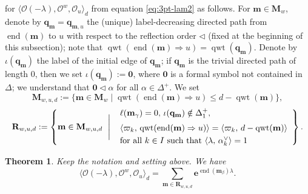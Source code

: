 \documentclass[11pt,a4paper,reqno,dvipdfmx]{amsart}
\numberwithin{equation}{section}
\newcommand{\CO}{\mathcal{O}}
\newcommand{\vpi}{\varpi}
\newcommand{\be}{\mathbf{e}}
\newcommand{\bm}{\mathbf{m}}
\newcommand{\bq}{\mathbf{q}}
\newcommand{\bM}{\mathbf{M}}
\newcommand{\bzero}{\mathbf{0}}
\DeclareMathOperator{\qwt}{qwt}
\DeclareMathOperator{\ed}{end}
\newcommand{\pair}[2]{\langle #1,\,#2 \rangle}
\newcommand{\bfR}{\mathbf{R}}
\theoremstyle{plain}
\newtheorem{thm}[lem]{Theorem}
\theoremstyle{definition}
\theoremstyle{remark}
\begin{document}
for $\langle \CO(- \lambda),\CO^{w},\CO_{u} \rangle_{d}$ from equation \eqref{eq:3pt-lam2} as follows. 
For $\bm \in \bM_{w}$, denote by $\bq_{\bm}=\bq_{\bm,u}$ 
the (unique) label-decreasing directed path from $\ed(\bm)$ to $u$ with respect to 
the reflection order $\lhd$ (fixed at the beginning of this subsection); 
note that $\qwt(\ed(\bm) \Rightarrow u) = \qwt(\bq_{\bm})$. 
Denote by $\iota(\bq_{\bm})$ the label of the initial edge of $\bq_{\bm}$; 
if $\bq_{\bm}$ is the trivial directed path of length $0$, 
then we set $\iota(\bq_{\bm}) := \bzero$, where $\bzero$ is a formal symbol 
not contained in $\Delta$; we understand that 
$\bzero \lhd \alpha$ for all $\alpha \in \Delta^{+}$.
We set 
%
\begin{equation}
\bM_{w,u,d}:=\bigl\{ \bm \in \bM_{w} \mid 
\qwt(\ed(\bm) \Rightarrow u) \le d - \qwt(\bm) \bigr\}, 
\end{equation}
%
%
\begin{equation} \label{eq:def-bfR}
\bfR_{w,u,d}:=\left\{ \bm \in \bM_{w,u,d} \ \Biggm| \ 
\begin{array}{l}
\ell(\bm_{\gamma}) = 0, \, \iota(\bq_{\bm}) \notin \Delta_{1}^{+}, \\[2mm] 
\pair{\vpi_{k}}{\qwt(\ed(\bm) \Rightarrow u)} = \pair{\vpi_{k}}{d - \qwt(\bm)} \\[1mm]
\text{for all $k \in I$ such that $\pair{\lambda}{\alpha_{k}^{\vee}} = 1$}
\end{array} \right\}. 
\end{equation}
%
%
\begin{thm} \label{thm:3pt-lam}
Keep the notation and setting above. We have 
%
\begin{equation}\label{eq:3ptkgw}
\langle \CO(- \lambda),\CO^{w},\CO_{u} \rangle_{d} = 
\sum_{\bm \in \bfR_{w,u,d}} \be^{\ed(\bm_{\beta})\lambda}. 
\end{equation}
%
\end{thm}
\end{document}
